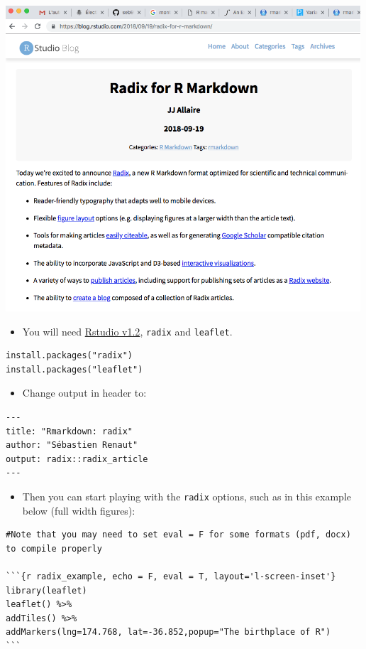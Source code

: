 \documentclass[]{article}
\providecommand{\tightlist}{%
  \setlength{\itemsep}{0pt}\setlength{\parskip}{0pt}}
\begin{document}
\includegraphics[width=5.20833in,height=\textheight]{../figures/radix.png}

\begin{itemize}
\tightlist
\item
  You will need
  \href{https://www.rstudio.com/products/rstudio/download/preview/}{Rstudio
  v1.2}, \texttt{radix} and \texttt{leaflet}.
\end{itemize}

\begin{verbatim}
install.packages("radix")  
install.packages("leaflet")  
\end{verbatim}

\begin{itemize}
\tightlist
\item
  Change output in header to:
\end{itemize}

\begin{verbatim}
---  
title: "Rmarkdown: radix"  
author: "Sébastien Renaut"  
output: radix::radix_article  
---  
\end{verbatim}

\begin{itemize}
\tightlist
\item
  Then you can start playing with the \texttt{radix} options, such as in
  this example below (full width figures):
\end{itemize}

\begin{verbatim}
#Note that you may need to set eval = F for some formats (pdf, docx) to compile properly

```{r radix_example, echo = F, eval = T, layout='l-screen-inset'}  
library(leaflet)  
leaflet() %>%  
addTiles() %>%   
addMarkers(lng=174.768, lat=-36.852,popup="The birthplace of R")  
```    
\end{verbatim}
\end{document}
